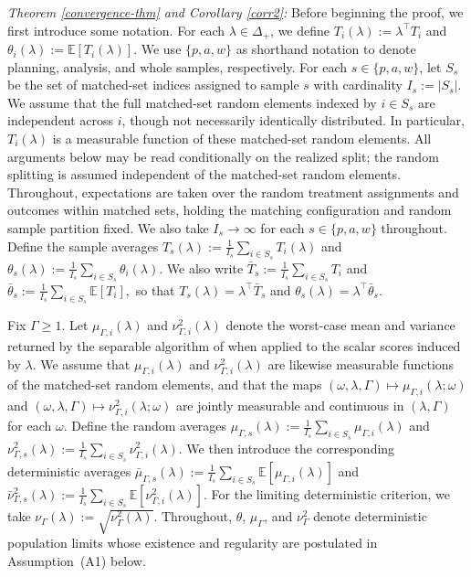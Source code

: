 \documentclass[12pt,leqno,titlepage]{amsart}
\newcommand{\1}{\mathbbm{1}}
\begin{document}
\begin{bibunit}
{\noindent \textit{Theorem \ref{convergence-thm} and Corollary \ref{corr2}:}
Before beginning the proof, we first introduce some notation. For each \(\lambda\in\Delta_+\), we define
$
T_i(\lambda):=\lambda^\top T_i
$ and $
\theta_i(\lambda):=\mathbb E[T_i(\lambda)].
$
We use \(\{p,a,w\}\) as shorthand notation to denote planning, analysis, and whole samples, respectively. For each \(s\in\{p,a,w\}\), let \(S_s\) be the set of matched-set indices assigned to sample \(s\) with cardinality \(I_s:=|S_s|\). We assume that the full matched-set random elements indexed by \(i\in S_s\) are independent across \(i\), though not necessarily identically distributed. In particular, \(T_i(\lambda)\) is a measurable function of these matched-set random elements. All arguments below may be read conditionally on the realized split; the random splitting is assumed independent of the matched-set random elements. Throughout, expectations are taken over the random treatment assignments and outcomes within matched sets, holding the matching configuration and random sample partition fixed. We also take \(I_s\to\infty\) for each \(s\in\{p,a,w\}\) throughout.  Define the sample averages
$
T_s(\lambda):=\frac1{I_s}\sum_{i\in S_s}T_i(\lambda)
$ and $
\theta_s(\lambda):=\frac1{I_s}\sum_{i\in S_s}\theta_i(\lambda).
$ We also write
$
\bar T_s:=\frac1{I_s}\sum_{i\in S_s}T_i$ and $
\bar\theta_s:=\frac1{I_s}\sum_{i\in S_s}\mathbb E[T_i],
$
so that $T_s(\lambda)=\lambda^\top \bar T_s$ and $\theta_s(\lambda)=\lambda^\top \bar\theta_s$.

Fix \(\Gamma\ge 1\). Let \(\mu_{\Gamma,i}(\lambda)\) and \(\nu_{\Gamma,i}^2(\lambda)\) denote the worst-case mean and variance returned by the separable algorithm of \cite{gastwirth2000asymptotic} when applied to the scalar scores induced by \(\lambda\). We assume that \(\mu_{\Gamma,i}(\lambda)\) and \(\nu_{\Gamma,i}^2(\lambda)\) are likewise measurable functions of the matched-set random elements, and that the maps $(\omega,\lambda,\Gamma)\mapsto\mu_{\Gamma,i}(\lambda;\omega)$ and $(\omega,\lambda,\Gamma)\mapsto\nu_{\Gamma,i}^2(\lambda;\omega)$ are jointly measurable and continuous in $(\lambda,\Gamma)$ for each $\omega$. Define the random averages
$
\mu_{\Gamma,s}(\lambda)
:=
\frac1{I_s}\sum_{i\in S_s}\mu_{\Gamma,i}(\lambda)$ and $
\nu_{\Gamma,s}^2(\lambda)
:=
\frac1{I_s}\sum_{i\in S_s}\nu_{\Gamma,i}^2(\lambda).
$
We then introduce the corresponding deterministic averages
$
\bar\mu_{\Gamma,s}(\lambda)
:=
\frac1{I_s}\sum_{i\in S_s}\mathbb E[\mu_{\Gamma,i}(\lambda)]
$ and $
\bar\nu_{\Gamma,s}^2(\lambda)
:=
\frac1{I_s}\sum_{i\in S_s}\mathbb E[\nu_{\Gamma,i}^2(\lambda)].
$
For the limiting deterministic criterion, we take
$
\nu_\Gamma(\lambda):=\sqrt{\nu_\Gamma^2(\lambda)}.
$ Throughout, $\theta$, $\mu_\Gamma$, and $\nu_\Gamma^2$ denote deterministic population limits whose existence and regularity are postulated in Assumption~\textup{(A1)} below.

}
\end{bibunit}
\end{document}
